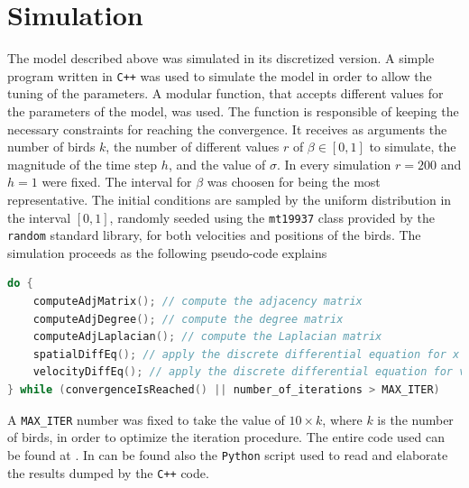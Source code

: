 \documentclass{article} %
\newcounter{late}
\begin{document}
\section {Simulation}
The model described above was simulated in its discretized version.
A simple program written in \verb|C++| was used to simulate the model in order to allow the
tuning of the parameters.
A modular function, that accepts different values for the parameters of the model, was used.
The function is responsible of keeping the necessary constraints for reaching the convergence.
It receives as arguments the number of birds $k$, the number of different values $r$
of $\beta\in[0,1]$ to simulate, the magnitude of the time step $h$, and the value of $\sigma$.
In every simulation $r=200$ and $h=1$ were fixed.
The interval for $\beta$ was choosen for being the most representative.
The initial conditions are sampled by the uniform distribution in the interval $[0,1]$, randomly
seeded using the \Verb|mt19937| class provided by the 
\verb|random| standard library, for both velocities and positions of the birds.
The simulation proceeds as the following pseudo-code explains
\begin{lstlisting}[language=C++]
do {
    computeAdjMatrix(); // compute the adjacency matrix
    computeAdjDegree(); // compute the degree matrix
    computeAdjLaplacian(); // compute the Laplacian matrix
    spatialDiffEq(); // apply the discrete differential equation for x
    velocityDiffEq(); // apply the discrete differential equation for v
} while (convergenceIsReached() || number_of_iterations > MAX_ITER)
\end{lstlisting}
A \verb|MAX_ITER| number was fixed to take the value of $10\times k$, where $k$ is the number
of birds, in order to optimize the iteration procedure. The entire code used can be found at \cite{repo}.
In \cite{repo} can be found also the \verb|Python| script used to read and elaborate the results
dumped by the \verb|C++| code.
\end{document}
